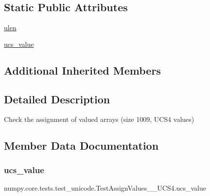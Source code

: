 \subsection*{Static Public Attributes}
\begin{DoxyCompactItemize}
\item 
\hyperlink{classnumpy_1_1core_1_1tests_1_1test__unicode_1_1TestAssignValues__1009__UCS4_a4c429e0683740a88f3e41cdbde9a0bd6}{ulen}
\item 
\hyperlink{classnumpy_1_1core_1_1tests_1_1test__unicode_1_1TestAssignValues__1009__UCS4_a431b73f2adeca7605bd93341d9b41695}{ucs\+\_\+value}
\end{DoxyCompactItemize}
\subsection*{Additional Inherited Members}


\subsection{Detailed Description}
\begin{DoxyVerb}Check the assignment of valued arrays (size 1009, UCS4 values)\end{DoxyVerb}
 

\subsection{Member Data Documentation}
\mbox{\label{classnumpy_1_1core_1_1tests_1_1test__unicode_1_1TestAssignValues__1009__UCS4_a431b73f2adeca7605bd93341d9b41695}} 
\subsubsection{\texorpdfstring{ucs\+\_\+value}{ucs\_value}}
{\footnotesize\ttfamily numpy.\+core.\+tests.\+test\+\_\+unicode.\+Test\+Assign\+Values\+\_\+\_\+\+U\+C\+S4.\+ucs\+\_\+value\hspace{0.3cm}{\ttfamily [static]}}

